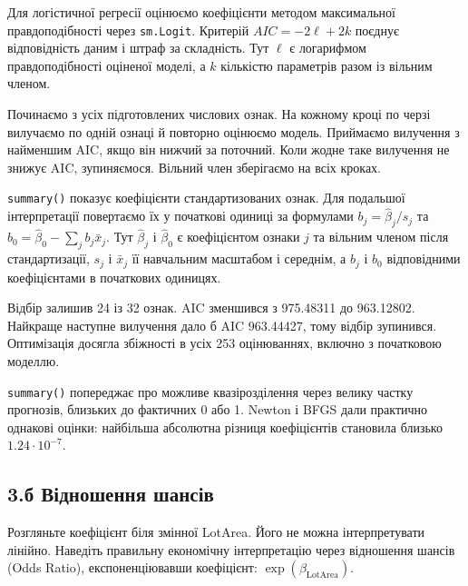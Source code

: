 \Needspace{19.2pt}


\answerheading
Для логістичної регресії оцінюємо коефіцієнти методом максимальної
правдоподібності через \texttt{sm.Logit}. Критерій \(AIC=-2\ell+2k\)
поєднує відповідність даним і штраф за складність. Тут \(\ell\) є
логарифмом правдоподібності оціненої моделі, а \(k\) кількістю
параметрів разом із вільним членом.

Починаємо з усіх підготовлених числових ознак. На кожному кроці по черзі
вилучаємо по одній ознаці й повторно оцінюємо модель. Приймаємо
вилучення з найменшим AIC, якщо він нижчий за поточний. Коли жодне таке
вилучення не знижує AIC, зупиняємося. Вільний член зберігаємо на всіх
кроках.

\texttt{summary()} показує коефіцієнти стандартизованих ознак. Для
подальшої інтерпретації повертаємо їх у початкові одиниці за формулами
\(b_j=\widehat\beta_j/s_j\) та
\(b_0=\widehat\beta_0-\sum_j b_j\bar x_j\). Тут \(\widehat\beta_j\) і
\(\widehat\beta_0\) є коефіцієнтом ознаки \(j\) та вільним членом після
стандартизації, \(s_j\) і \(\bar x_j\) її навчальним масштабом і
середнім, а \(b_j\) і \(b_0\) відповідними коефіцієнтами в початкових
одиницях.

Відбір залишив 24 із 32 ознак. AIC зменшився з 975.48311 до 963.12802.
Найкраще наступне вилучення дало б AIC 963.44427, тому відбір зупинився.
Оптимізація досягла збіжності в усіх 253 оцінюваннях, включно з
початковою моделлю.

\texttt{summary()} попереджає про можливе квазірозділення через велику
частку прогнозів, близьких до фактичних 0 або 1. Newton і BFGS дали
практично однакові оцінки: найбільша абсолютна різниця коефіцієнтів
становила близько \(1.24\cdot10^{-7}\).


\Needspace{275pt}

\subsection{3.б Відношення шансів}

\begin{taskstatement}Розгляньте коефіцієнт біля змінної LotArea. Його не можна інтерпретувати
лінійно. Наведіть правильну економічну інтерпретацію через відношення
шансів (Odds Ratio), експоненціювавши коефіцієнт:
\(\exp(\beta_{\mathrm{LotArea}})\).
\end{taskstatement}


